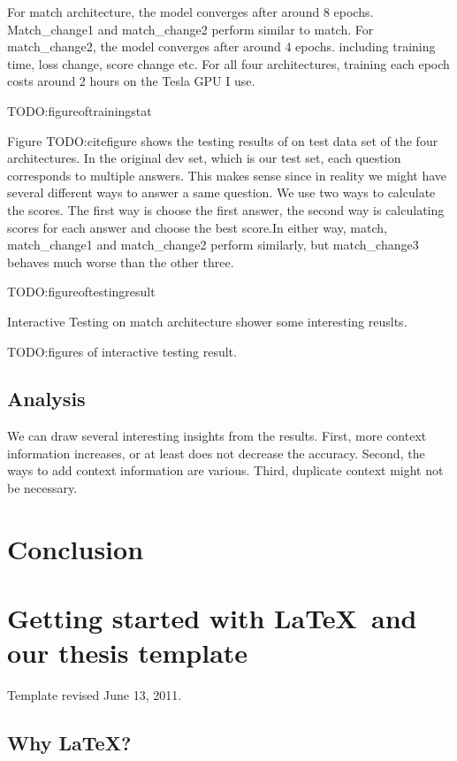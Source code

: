 \documentclass[modernstyle,12pt]{sjsuthesis}
\theoremstyle{definition}
\begin{document}
For match architecture, the model converges after around 8 epochs. Match\_change1 and match\_change2 perform similar to match. For match\_change2, the model converges after around 4 epochs.  including training time, loss change, score change etc. For all four architectures, training each epoch costs around 2 hours on the Tesla GPU I use.

TODO:figureoftrainingstat

Figure TODO:citefigure shows the testing results of on test data set of the four architectures. In the original dev set, which is our test set, each question corresponds to multiple answers. This makes sense since in reality we might have several different ways to answer a same question. We use two ways to calculate the scores. The first way is choose the first answer, the second way is calculating scores for each answer and choose the best score.In either way, match, match\_change1 and match\_change2 perform similarly, but match\_change3 behaves much worse than the other three.


TODO:figureoftestingresult

Interactive Testing on match architecture shower some interesting reuslts.

TODO:figures of interactive testing result.

\section{Analysis}
We can draw several interesting insights from the results. First, more context information increases, or at least does not decrease the accuracy. Second, the ways to add context information are various. Third, duplicate context might not be necessary.





\chapter{Conclusion}

\chapter{Getting started with \LaTeX\ and our thesis template}

Template revised June 13, 2011.

\section{Why \LaTeX?}
\end{document}
